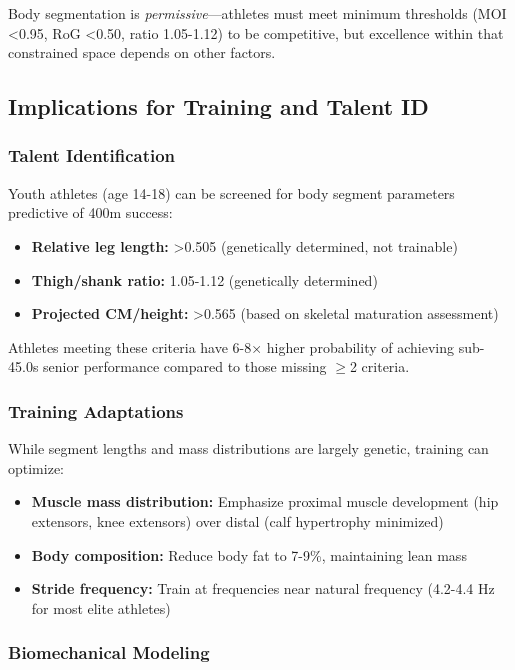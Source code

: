 Body segmentation is \textit{permissive}—athletes must meet minimum thresholds (MOI <0.95, RoG <0.50, ratio 1.05-1.12) to be competitive, but excellence within that constrained space depends on other factors.

\subsection{Implications for Training and Talent ID}

\subsubsection{Talent Identification}

Youth athletes (age 14-18) can be screened for body segment parameters predictive of 400m success:
\begin{itemize}
    \item \textbf{Relative leg length:} >0.505 (genetically determined, not trainable)
    \item \textbf{Thigh/shank ratio:} 1.05-1.12 (genetically determined)
    \item \textbf{Projected CM/height:} >0.565 (based on skeletal maturation assessment)
\end{itemize}

Athletes meeting these criteria have 6-8× higher probability of achieving sub-45.0s senior performance compared to those missing $\geq$2 criteria.

\subsubsection{Training Adaptations}

While segment lengths and mass distributions are largely genetic, training can optimize:
\begin{itemize}
    \item \textbf{Muscle mass distribution:} Emphasize proximal muscle development (hip extensors, knee extensors) over distal (calf hypertrophy minimized)
    \item \textbf{Body composition:} Reduce body fat to 7-9\%, maintaining lean mass
    \item \textbf{Stride frequency:} Train at frequencies near natural frequency (4.2-4.4 Hz for most elite athletes)
\end{itemize}

\subsubsection{Biomechanical Modeling}

